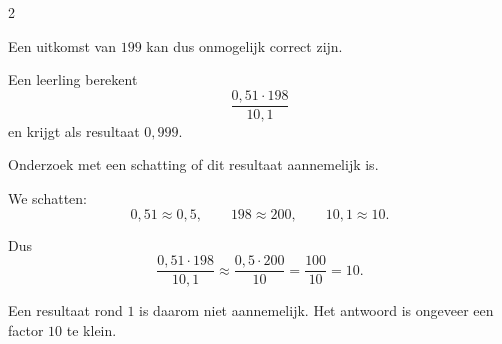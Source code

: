 \documentclass{ximera}
\begin{document}
\begin{oefening}{\oefU\ESS}
\begin{multicols}{2}
\begin{question}
\begin{oplossing}
                Een uitkomst van $199$ kan dus onmogelijk correct zijn.
                \end{oplossing}
                \end{question}
                
                
                \begin{question}
                Een leerling berekent
                \[
                \dfrac{0{,}51\cdot198}{10{,}1}
                \]
                en krijgt als resultaat $0{,}999$.
                
                Onderzoek met een schatting of dit resultaat aannemelijk is.
                
                \begin{oplossing}
                We schatten:
                \[
                0{,}51\approx0{,}5,
                \qquad
                198\approx200,
                \qquad
                10{,}1\approx10.
                \]
                
                Dus
                \[
                \dfrac{0{,}51\cdot198}{10{,}1}
                \approx
                \dfrac{0{,}5\cdot200}{10}
                =\dfrac{100}{10}
                =10.
                \]
                
                Een resultaat rond $1$ is daarom niet aannemelijk. Het antwoord is ongeveer een factor $10$ te klein.
                \end{oplossing}
                \end{question}
                
                \end{multicols}
                
                \end{oefening}



\end{document}
